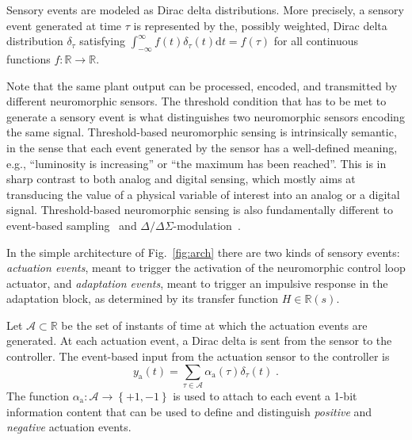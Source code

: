\documentclass{article}
\newcommand{\AC}{\mathcal{A}}
\newcommand{\RR}{\mathbb{R}}
\newcommand{\ra}{\mathrm{a}}
\newcommand{\rd}{\mathrm{d}}
\theoremstyle{definition}
\theoremstyle{remark}
\begin{document}
Sensory events are modeled as Dirac delta distributions. More precisely, a sensory event generated at time $\tau$ is represented by the, possibly weighted, Dirac delta distribution $\delta_\tau$ satisfying $\int_{-\infty}^\infty f(t)\delta_{\tau}(t)\rd t = f(\tau)$ for all continuous functions $f : \RR \to \RR$.

Note that the same plant output can be processed, encoded, and transmitted by different neuromorphic sensors. The threshold condition that has to be met to generate a sensory event is what distinguishes two neuromorphic sensors encoding the same signal. Threshold-based neuromorphic sensing is intrinsically semantic, in the sense that each event generated by the sensor has a well-defined meaning, e.g., ``luminosity is increasing'' or ``the maximum has been reached''. This is in sharp contrast to both analog and digital sensing, which mostly aims at transducing the value of a physical variable of interest into an analog or a digital signal. Threshold-based neuromorphic sensing is also fundamentally different to event-based sampling~\cite{astrom2008event,heemels2012introduction} and $\Delta/\Delta\Sigma$-modulation~\cite{Sira-Ramirez2015,razavi2016delta}.

In the simple architecture of Fig.~\ref{fig:arch} there are two kinds of sensory events: \emph{actuation events},  meant to trigger the activation of the neuromorphic control loop actuator, and \emph{adaptation events}, meant to trigger an impulsive response in the adaptation block, as determined by its transfer function $H \in \RR(s)$.

Let $\AC \subset \RR$ be the set of instants of time at which the actuation events are generated. At each actuation event, a Dirac delta is sent from the sensor to the controller. The event-based input from the actuation sensor to the controller is 
\begin{displaymath}
    y_\ra(t) = \sum_{\tau \in \AC}\alpha_\ra(\tau)\delta_{\tau}(t) \;.
\end{displaymath}
The function $\alpha_\ra : \AC \to \left\{+1,-1\right\}$ is used to attach to each event a 1-bit information content that can be used to define and distinguish \emph{positive} and \emph{negative} actuation events.
\end{document}
